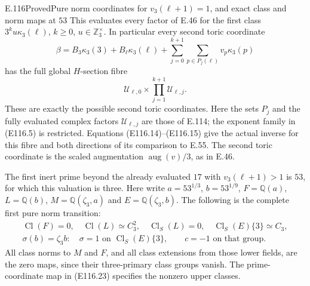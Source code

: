 \begin{statement}{E.116}{Proved}{Pure norm coordinates for $v_3(\ell+1)=1$, and exact class and norm maps at $53$}
This evaluates every factor of E.46 for the first class
$3^k u\kappa_3(\ell)$, $k\ge0$, $u\in\mathbb Z_3^\times$.
In particular every second toric coordinate
\[
  \beta=B_3\kappa_3(3)+B_\ell\kappa_3(\ell)
                 +\sum_{j=0}^{k+1}\sum_{p\in P_j(\ell)}v_p\kappa_3(p)
 \tag{E116.5}
\]
has the full global $H$-section fibre
\[
 \mathcal U_{\ell,0}\times\prod_{j=1}^{k+1}\mathcal U_{\ell,j}.
 \tag{E116.6}
\]
These are exactly the possible second toric coordinates.
Here the sets $P_j$ and the fully evaluated complex factors
$\mathcal U_{\ell,j}$ are those of E.114; the exponent family
in (E116.5) is restricted. Equations (E116.14)--(E116.15)
give the actual inverse for this fibre and both directions
of its comparison to E.55. The second toric coordinate is
the scaled augmentation $\operatorname{aug}(v)/3$, as in E.46.

The first inert prime beyond the already evaluated $17$
with $v_3(\ell+1)>1$ is $53$, for which this valuation is three.
Here write $a=53^{1/3}$, $b=53^{1/9}$,
$F=\mathbb Q(a)$, $L=\mathbb Q(b)$,
$M=\mathbb Q(\zeta_3,a)$ and $E=\mathbb Q(\zeta_3,b)$.
The following is the complete first pure norm transition:
\[
 \begin{gathered}
 \operatorname{Cl}(F)=0,\quad
 \operatorname{Cl}(L)\simeq C_3^2,\quad
 \operatorname{Cl}_S(L)=0,\quad
 \operatorname{Cl}_S(E)\{3\}\simeq C_3,\\
 \sigma(b)=\zeta_3b:\quad\sigma=1
       \text{ on }\operatorname{Cl}_S(E)\{3\},
 \qquad c=-1\text{ on that group}.
 \end{gathered}
 \tag{E116.7}
\]
All class norms to $M$ and $F$, and all class extensions
from those lower fields, are the zero maps, since their
three-primary class groups vanish. The prime-coordinate
map in (E116.23) specifies the nonzero upper classes.


\end{statement}
